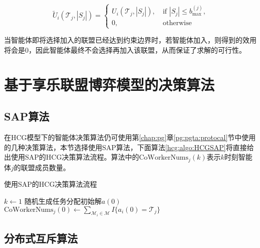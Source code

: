 \begin{equation}
\label{hcg:eq:modifiedAgentU}
	\widetilde U_i(\mathcal{T}_j,|S_j|) = 
	\begin{cases}
		U_i(\mathcal{T}_j,|S_j|),\ & \text{if $|S_j|\leq b_{\text{max}}^{(j)}$,}\\
		0,\ & \text{otherwise}
	\end{cases}
\end{equation}

当智能体即将选择加入的联盟已经达到约束边界时，若智能体加入，则得到的效用将会是0，因此智能体最终不会选择再加入该联盟，从而保证了求解的可行性。

\section{基于享乐联盟博弈模型的决策算法}
\label{hcg:decision}

\subsection{SAP算法}
在HCG模型下的智能体决策算法仍可使用第\ref{chap:pg}章\ref{pg:pgta:protocal}节中使用的几种决策算法，本节选择使用SAP算法，下面算法\ref{hcg:algo:HCGSAP}将直接给出使用SAP的HCG决策算法流程。算法中的$\text{CoWorkerNums}_j(k)$表示$k$时刻智能体$j$的联盟成员数量。

\begin{algorithm}[htb]
	\caption{使用SAP的HCG决策算法流程}
	\label{hcg:algo:HCGSAP}
	\small
	\SetAlgoLined
	$k \gets 1$\;
	随机生成任务分配初始解$a(0)$\;
	$\text{CoWorkerNums}_j(0) \gets \sum_{\mathcal{M}_i \in \mathcal{M}} I\{a_i(0)=\mathcal{T}_j\}$\;
\end{algorithm}

\subsection{分布式互斥算法}

